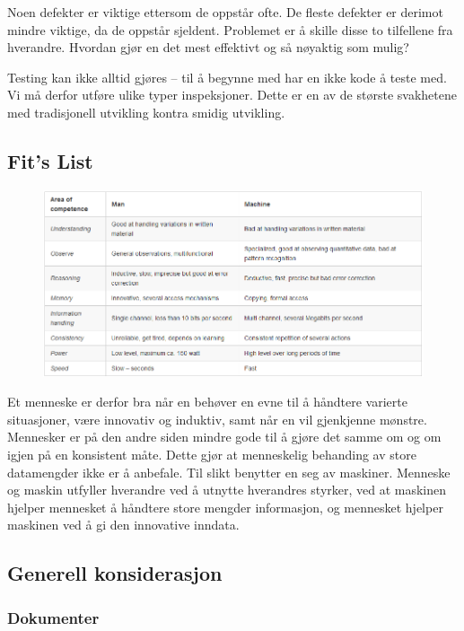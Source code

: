Noen defekter er viktige ettersom de oppstår ofte. De fleste defekter er
derimot mindre viktige, da de oppstår sjeldent. Problemet er å skille
disse to tilfellene fra hverandre. Hvordan gjør en det mest effektivt og
så nøyaktig som mulig?

Testing kan ikke alltid gjøres -- til å begynne med har en ikke kode å
teste med. Vi må derfor utføre ulike typer inspeksjoner. Dette er en av
de største svakhetene med tradisjonell utvikling kontra smidig
utvikling.

\subsection{Fit's List}

\begin{figure}[htbp]
\centering
\includegraphics{Forelesning 05/img/3.png}
\caption{}
\end{figure}

Et menneske er derfor bra når en behøver en evne til å håndtere varierte
situasjoner, være innovativ og induktiv, samt når en vil gjenkjenne
mønstre. Mennesker er på den andre siden mindre gode til å gjøre det
samme om og om igjen på en konsistent måte. Dette gjør at menneskelig
behanding av store datamengder ikke er å anbefale. Til slikt benytter en
seg av maskiner. Menneske og maskin utfyller hverandre ved å utnytte
hverandres styrker, ved at maskinen hjelper mennesket å håndtere store
mengder informasjon, og mennesket hjelper maskinen ved å gi den
innovative inndata.

\subsection{Generell konsiderasjon}

\subsubsection{Dokumenter}

